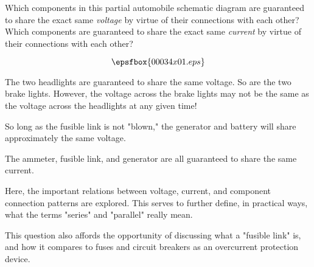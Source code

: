 

Which components in this partial automobile schematic diagram are guaranteed to share the exact same {\it voltage} by virtue of their connections with each other?  Which components are guaranteed to share the exact same {\it current} by virtue of their connections with each other?

$$\epsfbox{00034x01.eps}$$







The two headlights are guaranteed to share the same voltage.  So are the two brake lights.  However, the voltage across the brake lights may not be the same as the voltage across the headlights at any given time!

So long as the fusible link is not "blown," the generator and battery will share approximately the same voltage.

The ammeter, fusible link, and generator are all guaranteed to share the same current.







Here, the important relations between voltage, current, and component connection patterns are explored.  This serves to further define, in practical ways, what the terms "series" and "parallel" really mean.

This question also affords the opportunity of discussing what a "fusible link" is, and how it compares to fuses and circuit breakers as an overcurrent protection device.




